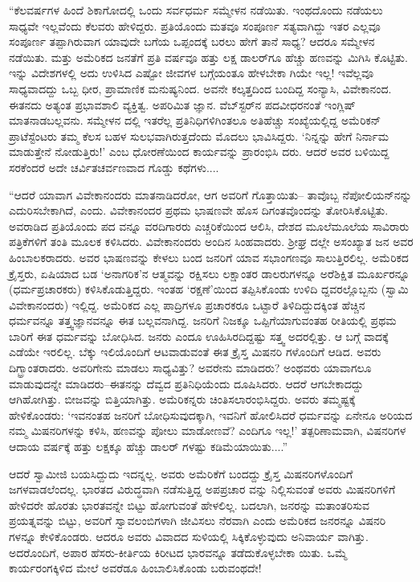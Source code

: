 “ಕೆಲವರ್ಷಗಳ ಹಿಂದೆ ಶಿಕಾಗೋದಲ್ಲಿ ಒಂದು ಸರ್ವಧರ್ಮ ಸಮ್ಮೇಳನ ನಡೆಯಿತು. ಇಂಥದೊಂದು ನಡೆಯಲು ಸಾಧ್ಯವೇ ಇಲ್ಲವೆಂದು ಕೆಲವರು ಹೇಳಿದ್ದರು. ಪ್ರತಿಯೊಂದು ಮತವೂ ಸಂಪೂರ್ಣ ಸತ್ಯವಾಗಿದ್ದು ಇತರ ಎಲ್ಲವೂ ಸಂಪೂರ್ಣ ತಪ್ಪಾಗಿರುವಾಗ ಯಾವುದೇ ಬಗೆಯ ಒಪ್ಪಂದಕ್ಕೆ ಬರಲು ಹೇಗೆ ತಾನೆ ಸಾಧ್ಯ? ಆದರೂ ಸಮ್ಮೇಳನ ನಡೆಯಿತು. ಮತ್ತು ಅಮೆರಿಕದ ಜನತೆಗೆ ಪ್ರತಿ ವರ್ಷವೂ ಹತ್ತು ಲಕ್ಷ ಡಾಲರ್​ಗೂ ಹೆಚ್ಚು ಹಣವನ್ನು ಮಿಗಿಸಿ ಕೊಟ್ಟಿತು. ಇನ್ನು ವಿದೇಶಗಳಲ್ಲಿ ಅದು ಉಳಿಸಿದ ಎಷ್ಟೋ ಜೀವಗಳ ಬಗ್ಗೆಯಂತೂ ಹೇಳಬೇಕಾ ಗಿಯೇ ಇಲ್ಲ! ಇವೆಲ್ಲವೂ ಸಾಧ್ಯವಾದದ್ದು ಒಬ್ಬ ಧೀರ, ಪ್ರಾಮಾಣಿಕ ಮನುಷ್ಯನಿಂದ. ಅವನೇ ಕಲ್ಕತ್ತದಿಂದ ಬಂದಿದ್ದ ಸಂನ್ಯಾಸಿ, ವಿವೇಕಾನಂದ. ಈತನದು ಅತ್ಯಂತ ಪ್ರಭಾವಶಾಲಿ ವ್ಯಕ್ತಿತ್ವ. ಅಪರಿಮಿತ ಜ್ಞಾನ. ವೆಬ್​ಸ್ಟರ್​ನ ಪದವೀಧರನಂತೆ ಇಂಗ್ಲಿಷ್ ಮಾತನಾಡಬಲ್ಲವನು. ಸಮ್ಮೇಳನ ದಲ್ಲಿ ಇತರೆಲ್ಲ ಪ್ರತಿನಿಧಿಗಳಿಗಿಂತಲೂ ಅತಿಹೆಚ್ಚು ಸಂಖ್ಯೆಯಲ್ಲಿದ್ದ ಅಮೆರಿಕನ್ ಪ್ರಾಟೆಸ್ಟೆಂಟರು ತಮ್ಮ ಕೆಲಸ ಬಹಳ ಸುಲಭವಾಗಿರುತ್ತದೆಂದು ಮೊದಲು ಭಾವಿಸಿದ್ದರು. ‘ನಿನ್ನನ್ನು ಹೇಗೆ ನಿರ್ನಾಮ ಮಾಡುತ್ತೇನೆ ನೋಡುತ್ತಿರು!’ ಎಂಬ ಧೋರಣೆಯಿಂದ ಕಾರ್ಯವನ್ನು ಪ್ರಾರಂಭಿಸಿ ದರು. ಆದರೆ ಅವರ ಬಳಿಯಿದ್ದ ಸರಕೆಂದರೆ ಅದೇ ಚರ್ವಿತಚರ್ವಣವಾದ ಗೊಡ್ಡು ಕಥೆಗಳು....

“ಆದರೆ ಯಾವಾಗ ವಿವೇಕಾನಂದರು ಮಾತನಾಡಿದರೋ, ಆಗ ಅವರಿಗೆ ಗೊತ್ತಾಯಿತು– ತಾವೊಬ್ಬ ನೆಪೋಲಿಯನ್​ನನ್ನು ಎದುರಿಸಬೇಕಾಗಿದೆ, ಎಂದು. ವಿವೇಕಾನಂದರ ಪ್ರಥಮ ಭಾಷಣವೇ ಹೊಸ ದಿಗಂತವೊಂದನ್ನು ತೋರಿಸಿಕೊಟ್ಟಿತು. ಅವರಾಡಿದ ಪ್ರತಿಯೊಂದು ಪದ ವನ್ನೂ ವರದಿಗಾರರು ಎಚ್ಚರಿಕೆಯಿಂದ ಆಲಿಸಿ, ದೇಶದ ಮೂಲೆಮೂಲೆಯ ಸಾವಿರಾರು ಪತ್ರಿಕೆಗಳಿಗೆ ತಂತಿ ಮೂಲಕ ಕಳಿಸಿದರು. ವಿವೇಕಾನಂದರು ಅಂದಿನ ಸಿಂಹವಾದರು. ಶ್ರೀಘ್ರ ದಲ್ಲೇ ಅಸಂಖ್ಯಾತ ಜನ ಅವರ ಹಿಂಬಾಲಕರಾದರು. ಅವರ ಭಾಷಣವನ್ನು ಕೇಳಲು ಬಂದ ಜನರಿಗೆ ಯಾವ ಸಭಾಂಗಣವೂ ಸಾಲುತ್ತಿರಲಿಲ್ಲ. ಅಮೆರಿಕದ ಕ್ರೈಸ್ತರು, ಏಷಿಯಾದ ಬಡ ‘ಅನಾಗರಿಕ’ನ ಆತ್ಮವನ್ನು ರಕ್ಷಿಸಲು ಲಕ್ಷಾಂತರ ಡಾಲರುಗಳನ್ನೂ ಅರೆಶಿಕ್ಷಿತ ಮೂರ್ಖರನ್ನೂ (ಧರ್ಮಪ್ರಚಾರಕರು) ಕಳಿಸಿಕೊಡುತ್ತಿದ್ದರು. ಇಂತಹ ‘ರಕ್ಷಣೆ’ಯಿಂದ ತಪ್ಪಿಸಿಕೊಂಡು ಉಳಿದಿ ದ್ದವರಲ್ಲೊಬ್ಬನು (ಸ್ವಾಮಿ ವಿವೇಕಾನಂದರು) ಇಲ್ಲಿದ್ದ. ಅಮೆರಿಕದ ಎಲ್ಲ ಪಾದ್ರಿಗಳೂ ಪ್ರಚಾರಕರೂ ಒಟ್ಟಾರೆ ತಿಳಿದಿದ್ದುದಕ್ಕಿಂತ ಹೆಚ್ಚಿನ ಧರ್ಮವನ್ನೂ ತತ್ತ್ವಜ್ಞಾನವನ್ನೂ ಈತ ಬಲ್ಲವನಾಗಿದ್ದ. ಜನರಿಗೆ ನಿಜಕ್ಕೂ ಒಪ್ಪಿಗೆಯಾಗುವಂತಹ ರೀತಿಯಲ್ಲಿ ಪ್ರಥಮ ಬಾರಿಗೆ ಈತ ಧರ್ಮವನ್ನು ಬೋಧಿಸಿದ. ಜನರು ಎಂದೂ ಊಹಿಸಿರದಿದ್ದಷ್ಟು ಸತ್ತ್ವ ಅದರಲ್ಲಿತ್ತು. ಆ ಬಗ್ಗೆ ವಾದಕ್ಕೆ ಎಡೆಯೇ ಇರಲಿಲ್ಲ. ಬೆಕ್ಕು ಇಲಿಯೊಂದಿಗೆ ಆಟವಾಡುವಂತೆ ಈತ ಕ್ರೈಸ್ತ ಮಿಷನರಿ ಗಳೊಂದಿಗೆ ಆಡಿದ. ಅವರು ದಿಗ್ಭ್ರಾಂತರಾದರು. ಅವರಿಗೇನು ಮಾಡಲು ಸಾಧ್ಯವಿತ್ತು? ಅವರೇನು ಮಾಡಿದರು? ಅಂಥವರು ಯಾವಾಗಲೂ ಮಾಡುವುದನ್ನೇ ಮಾಡಿದರು–ಈತನನ್ನು ದೆವ್ವದ ಪ್ರತಿನಿಧಿಯೆಂದು ದೂಷಿಸಿದರು. ಆದರೆ ಆಗಬೇಕಾದದ್ದು ಆಗಿಹೋಗಿತ್ತು. ಬೀಜವನ್ನು ಬಿತ್ತಿಯಾಗಿತ್ತು. ಅಮೆರಿಕನ್ನರು ಚಿಂತಿಸಲಾರಂಭಿಸಿದ್ದರು. ಅವರು ತಮ್ಮಷ್ಟಕ್ಕೆ ಹೇಳಿಕೊಂಡರು: ‘ಇವನಂತಹ ಜನರಿಗೆ ಬೋಧಿಸುವುದಕ್ಕಾಗಿ, ಇವನಿಗೆ ಹೋಲಿಸಿದರೆ ಧರ್ಮವನ್ನು ಏನೇನೂ ಅರಿಯದ ನಮ್ಮ ಮಿಷನರಿಗಳನ್ನು ಕಳಿಸಿ, ಹಣವನ್ನು ಪೋಲು ಮಾಡೋಣವೆ? ಎಂದಿಗೂ ಇಲ್ಲ!’ ತತ್ಪರಿಣಾಮವಾಗಿ, ವಿಷನರಿಗಳ ಆದಾಯ ವರ್ಷಕ್ಕೆ ಹತ್ತು ಲಕ್ಷಕ್ಕೂ ಹೆಚ್ಚು ಡಾಲರ್ ಗಳಷ್ಟು ಕಡಿಮೆಯಾಯಿತು....”

ಆದರೆ ಸ್ವಾಮೀಜಿ ಬಯಸಿದ್ದುದು ಇದನ್ನಲ್ಲ. ಅವರು ಅಮೆರಿಕೆಗೆ ಬಂದದ್ದು ಕ್ರೈಸ್ತ ಮಿಷನರಿಗಳೊಂದಿಗೆ ಜಗಳವಾಡಲೆಂದಲ್ಲ. ಭಾರತದ ವಿರುದ್ಧವಾಗಿ ನಡೆಸುತ್ತಿದ್ದ ಅಪಪ್ರಚಾರ ವನ್ನು ನಿಲ್ಲಿಸುವಂತೆ ಅವರು ಮಿಷನರಿಗಳಿಗೆ ಹೇಳಿದರೇ ಹೊರತು ಭಾರತವನ್ನೇ ಬಿಟ್ಟು ಹೋಗುವಂತೆ ಹೇಳಲಿಲ್ಲ. ಬದಲಾಗಿ, ಜನರನ್ನು ಮತಾಂತರಿಸುವ ಪ್ರಯತ್ನವನ್ನು ಬಿಟ್ಟು, ಅವರಿಗೆ ಸ್ವಾವಲಂಬಿಗಳಾಗಿ ಜೀವಿಸಲು ನೆರವಾಗಿ ಎಂದು ಅಮೆರಿಕದ ಜನರನ್ನೂ ವಿಷನರಿ ಗಳನ್ನೂ ಕೇಳಿಕೊಂಡರು. ಆದರೂ ಅವರು ವಿವಾದದ ಸುಳಿಯಲ್ಲಿ ಸಿಕ್ಕಿಕೊಳ್ಳುವುದು ಅನಿವಾರ್ಯ ವಾಗಿತ್ತು. ಅದರೊಂದಿಗೆ, ಅಪಾರ ಹೆಸರು-ಕೀರ್ತಿಯ ಕಿರೀಟದ ಭಾರವನ್ನೂ ತಡೆದುಕೊಳ್ಳಬೇಕಾ ಯಿತು. ಒಮ್ಮೆ ಕಾರ್ಯರಂಗಕ್ಕಿಳಿದ ಮೇಲೆ ಅವರೆಡೂ ಹಿಂಬಾಲಿಸಿಕೊಂಡು ಬರುವಂಥದೇ!

